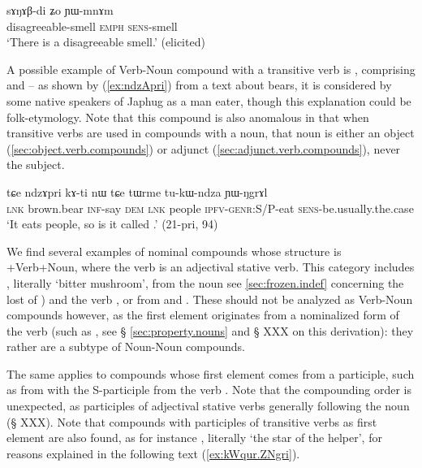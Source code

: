 \begin{exe}
\ex \label{ex:sANABdi}
\gll sɤŋɤβ-di ʑo ɲɯ-mnɤm \\
disagreeable-smell \textsc{emph} \textsc{sens}-smell \\
\glt `There is a disagreeable smell.' (elicited)
\end{exe}
A possible example of Verb-Noun compound with a transitive verb is , comprising  and  -- as shown by (\ref{ex:ndzApri}) from a text about bears, it is considered by some native speakers of Japhug as a man eater, though this explanation could be folk-etymology. Note that this compound is also anomalous in that when transitive verbs are used in compounds with a noun, that noun is either an object (\ref{sec:object.verb.compounds}) or adjunct (\ref{sec:adjunct.verb.compounds}), never the subject.

\begin{exe}
\ex \label{ex:ndzApri}
\gll tɕe ndzɤpri kɤ-ti nɯ tɕe tɯrme tu-kɯ-ndza ɲɯ-ŋgrɤl \\
\textsc{lnk} brown.bear \textsc{inf}-say \textsc{dem} \textsc{lnk} people \textsc{ipfv}-\textsc{genr}:S/P-eat \textsc{sens}-be.usually.the.case \\
\glt `It eats people, so is it called .' (21-pri, 94)
\end{exe} 

We find several examples of nominal compounds whose structure is +Verb+Noun, where the verb is an adjectival stative verb. This category includes , literally `bitter mushroom', from the noun  see \ref{sec:frozen.indef} concerning the lost of ) and the verb , or  from  and . These should not be analyzed as Verb-Noun compounds however, as the first element originates from a nominalized form of the verb (such as , see § \ref{sec:property.nouns} and § XXX on this derivation): they rather are a subtype of Noun-Noun compounds.

The same applies to compounds whose first element comes from a participle, such as  from  with the S-participle   from the verb . Note that the compounding order is unexpected, as participles of adjectival stative verbs generally following the noun (§ XXX). Note that compounds with participles of transitive verbs as first element are also found, as for instance , literally `the star of the helper', for reasons explained in the following text (\ref{ex:kWqur.ZNgri}).

